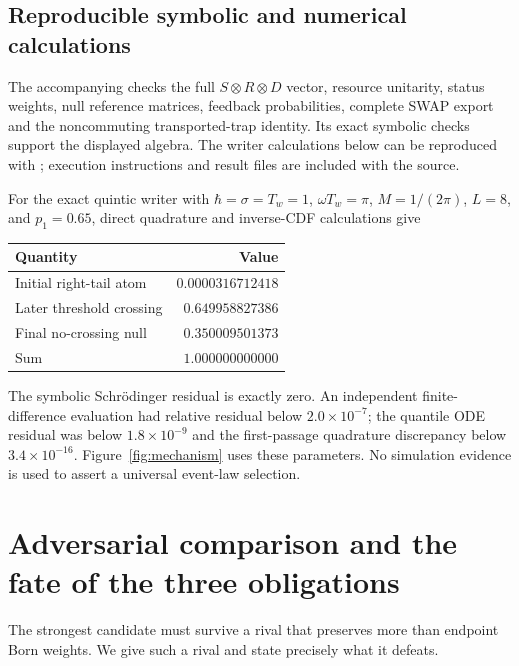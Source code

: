 \documentclass[11pt]{article}
\theoremstyle{definition}\newtheorem{assumption}[theorem]{Constitutive assumption}
\theoremstyle{remark}\newtheorem{remark}[theorem]{Remark}
\begin{document}
\subsection{Reproducible symbolic and numerical calculations}
The accompanying  checks the full $S\otimes R\otimes D$ vector, resource unitarity, status weights, null reference matrices, feedback probabilities, complete SWAP export and the noncommuting transported-trap identity. Its exact symbolic checks support the displayed algebra. The writer calculations below can be reproduced with ; execution instructions and result files are included with the source.

For the exact quintic writer with $\hbar=\sigma=T_w=1$, $\omega T_w=\pi$, $M=1/(2\pi)$, $L=8$, and $p_1=0.65$, direct quadrature and inverse-CDF calculations give
\begin{center}
\begin{tabular}{@{}lr@{}}\toprule
Quantity & Value\\\midrule
Initial right-tail atom & $0.0000316712418$\\
Later threshold crossing & $0.649958827386$\\
Final no-crossing null & $0.350009501373$\\
Sum & $1.000000000000$\\\bottomrule
\end{tabular}
\end{center}
The symbolic Schr\"odinger residual is exactly zero. An independent finite-difference evaluation had relative residual below $2.0\times10^{-7}$; the quantile ODE residual was below $1.8\times10^{-9}$ and the first-passage quadrature discrepancy below $3.4\times10^{-16}$. Figure~\ref{fig:mechanism} uses these parameters. No simulation evidence is used to assert a universal event-law selection.

\section{Adversarial comparison and the fate of the three obligations}
\label{sec:rivals}
The strongest candidate must survive a rival that preserves more than endpoint Born weights. We give such a rival and state precisely what it defeats.
\end{document}
